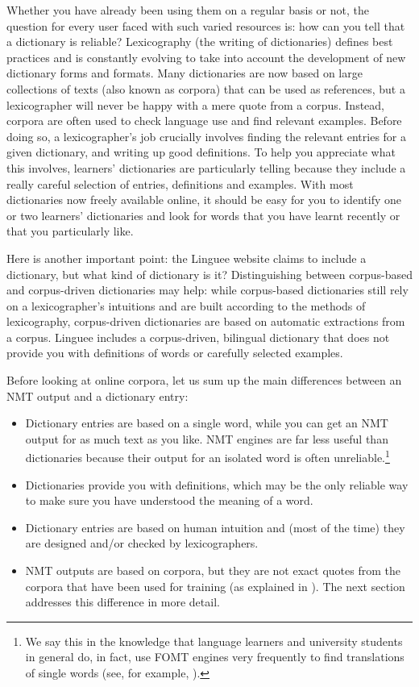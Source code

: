 \documentclass[output=paper,colorlinks,citecolor=brown,
]{langscibook}
\begin{document}
Whether you have already been using them on a regular basis or not, the question for every user faced with such varied resources is: how can you tell that a dictionary is reliable? Lexicography (the writing of dictionaries) defines best practices and is constantly evolving to take into account the development of new dictionary forms and formats. Many dictionaries are now based on large collections of texts (also known as corpora) that can be used as references, but a lexicographer will never be happy with a mere quote from a corpus. Instead, corpora are often used to check language use and find relevant examples. Before doing so, a lexicographer’s job crucially involves finding the relevant entries for a given dictionary, and writing up good definitions. To help you appreciate what this involves, learners’ dictionaries are particularly telling because they include a really careful selection of entries, definitions and examples. With most dictionaries now freely available online, it should be easy for you to identify one or two learners’ dictionaries and look for words that you have learnt recently or that you particularly like. 

Here is another important point: the Linguee website claims to include a dictionary, but what kind of dictionary is it? Distinguishing between corpus-based and corpus-driven dictionaries may help: while corpus-based dictionaries still rely on a lexicographer’s intuitions and are built according to the methods of lexicography, corpus-driven dictionaries are based on automatic extractions from a corpus. Linguee includes a corpus-driven, bilingual dictionary that does not provide you with definitions of words or carefully selected examples. 

Before looking at online corpora, let us sum up the main differences between an NMT output and a dictionary entry:\largerpage[-2]

\begin{itemize}
\item  Dictionary entries are based on a single word, while you can get an NMT output for as much text as you like. NMT engines are far less useful than dictionaries because their output for an isolated word is often unreliable.\footnote{We say this in the knowledge that language learners and university students in general do, in fact, use FOMT engines very frequently to find translations of single words (see, for example, \citealt{JolleyMaimone2022, DorstBouman2022}).}
\item  Dictionaries provide you with definitions, which may be the only reliable way to make sure you have understood the meaning of a word.
\item  Dictionary entries are based on human intuition and (most of the time) they are designed and/or checked by lexicographers.
\item  NMT outputs are based on corpora, but they are not exact quotes from the corpora that have been used for training (as explained in ). The next section addresses this difference in more detail.
\end{itemize}
\end{document}
